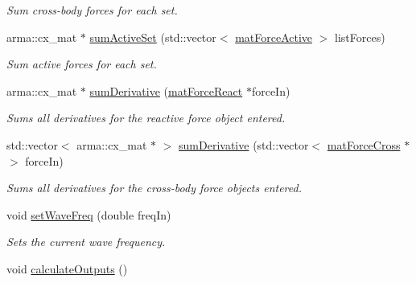 \begin{DoxyCompactItemize}
\begin{DoxyCompactList}\small\item\em Sum cross-\/body forces for each set. \end{DoxyCompactList}\item 
arma\-::cx\-\_\-mat $\ast$ \hyperlink{classosea_1_1ofreq_1_1_motion_solver_a3cb1ad32fc63451422af408f7c07fda6}{sum\-Active\-Set} (std\-::vector$<$ \hyperlink{classosea_1_1ofreq_1_1mat_force_active}{mat\-Force\-Active} $>$ list\-Forces)
\begin{DoxyCompactList}\small\item\em Sum active forces for each set. \end{DoxyCompactList}\item 
arma\-::cx\-\_\-mat $\ast$ \hyperlink{classosea_1_1ofreq_1_1_motion_solver_abe3c2cac5c822e59db5914bf5450d514}{sum\-Derivative} (\hyperlink{classosea_1_1ofreq_1_1mat_force_react}{mat\-Force\-React} $\ast$force\-In)
\begin{DoxyCompactList}\small\item\em Sums all derivatives for the reactive force object entered. \end{DoxyCompactList}\item 
std\-::vector$<$ arma\-::cx\-\_\-mat $\ast$ $>$ \hyperlink{classosea_1_1ofreq_1_1_motion_solver_a7e5465b12b38dd33a57b04b5f07aa21d}{sum\-Derivative} (std\-::vector$<$ \hyperlink{classosea_1_1ofreq_1_1mat_force_cross}{mat\-Force\-Cross} $\ast$ $>$ force\-In)
\begin{DoxyCompactList}\small\item\em Sums all derivatives for the cross-\/body force objects entered. \end{DoxyCompactList}\item 
void \hyperlink{classosea_1_1ofreq_1_1_motion_solver_a5deee421d26ef9729e0a870fd48b4403}{set\-Wave\-Freq} (double freq\-In)
\begin{DoxyCompactList}\small\item\em Sets the current wave frequency. \end{DoxyCompactList}\item 
\hypertarget{classosea_1_1ofreq_1_1_motion_solver_a28190e2b9c937f8889ba37db35069c52}{void \hyperlink{classosea_1_1ofreq_1_1_motion_solver_a28190e2b9c937f8889ba37db35069c52}{calculate\-Outputs} ()}\label{classosea_1_1ofreq_1_1_motion_solver_a28190e2b9c937f8889ba37db35069c52}


\end{DoxyCompactItemize}
